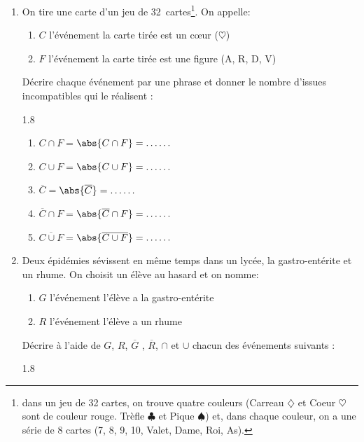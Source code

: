 \documentclass[main.tex]{subfiles}
\begin{document}
\begin{exercise}
\begin{enumerate}[label=\arabic*),leftmargin=*]
\begin{spacing}{1.8}
\end{spacing} 
\vspace{-0.5em}	
\item On tire une carte d'un jeu de 32~cartes\footnote{dans un jeu de 32 cartes, on trouve quatre couleurs (Carreau $\diamondsuit$ et Coeur $\heartsuit$ sont de couleur rouge. Trèfle $\clubsuit$ et Pique $\spadesuit$) et, dans chaque couleur, on a une série de 8 cartes (7, 8, 9, 10, Valet, Dame, Roi, As).}.  On appelle:
\begin{enumerate}[label=\textbullet,leftmargin=*]
	\item  $C$ l'événement \og la carte tirée est un cœur ($\heartsuit$) \fg 
	\item  $F$ l'événement \og la carte tirée est une figure (A, R, D, V)\fg 
\end{enumerate}
	Décrire chaque événement par une phrase et donner le nombre d'issues incompatibles qui le réalisent : 
	\vspace{-0.5em}
\begin{spacing}{1.8}
	\begin{enumerate}[label={},leftmargin=*]
		\item $C\cap F=$\og \dotfill \fg $\abs{C\cap F}=\ldots\ldots$
		\item $C\cup F=$\og \dotfill \fg $\abs{C\cup F}=\ldots\ldots$
		\item $\overline{C}=$\og \dotfill \fg $\abs{\overline{C}}=\ldots\ldots$
		\item $\overline{C}\cap F=$\og \dotfill \fg $\abs{\overline{C}\cap F}=\ldots\ldots$
		\item $\overline{C\cup F}=$\og \dotfill \fg $\abs{\overline{C\cup F}}=\ldots\ldots$
	\end{enumerate} 
\end{spacing} 
\vspace{-0.5em}
\item 	Deux épidémies sévissent en même temps dans un lycée, la gastro-entérite et un rhume. On choisit un élève au hasard et on nomme:
\begin{enumerate}[label=\textbullet,leftmargin=*]
	\item  $G$ l'événement \og l'élève a la gastro-entérite\fg{}
	\item   $R$ l'événement \og l'élève a un rhume\fg 
\end{enumerate} 
Décrire   à l'aide de $G$, $R$, $\overline{G}$ , $\overline{R}$, $\cap$ et $\cup$ chacun des événements suivants : 
\vspace{-0.5em}
\begin{spacing}{1.8}

\end{spacing}
\end{enumerate}
\end{exercise}
\end{document}
